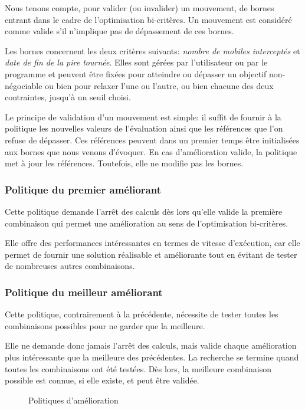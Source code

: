 			Nous tenons compte, pour valider (ou invalider) un mouvement, de bornes entrant dans le cadre de l'optimisation bi-critères. Un mouvement est considéré comme valide s'il n'implique pas de dépassement de ces bornes. 

			Les bornes concernent les deux critères suivants: \emph{nombre de mobiles interceptés} et \emph{date de fin de la pire tournée}. Elles sont gérées par l'utilisateur ou par le programme et peuvent être fixées pour atteindre ou dépasser un objectif non-négociable ou bien pour relaxer l'une ou l'autre, ou bien chacune des deux contraintes, jusqu'à un seuil choisi.

			Le principe de validation d'un mouvement est simple: il suffit de fournir à la politique les nouvelles valeurs de l'évaluation ainsi que les références que l'on refuse de dépasser. Ces références peuvent dans un premier temps être initialisées aux bornes que nous venons d'évoquer. En cas d'amélioration valide, la politique met à jour les références. Toutefois, elle ne modifie pas les bornes.

			\subsubsection{Politique du premier améliorant}
				\label{subs:first_available_policy}
				Cette politique demande l'arrêt des calculs dès lors qu'elle valide la première combinaison qui permet une amélioration au sens de l'optimisation bi-critères. 

				Elle offre des performances intéressantes en termes de vitesse d'exécution, car elle permet de fournir une solution réalisable et améliorante tout en évitant de tester de nombreuses autres combinaisons.

			\subsubsection{Politique du meilleur améliorant}
				\label{subs:best_available_policy}
				Cette politique, contrairement à la précédente, nécessite de tester toutes les combinaisons possibles pour ne garder que la meilleure. 

				Elle ne demande donc jamais l'arrêt des calculs, mais valide chaque amélioration plus intéressante que la meilleure des précédentes. La recherche se termine quand toutes les combinaisons ont été testées. Dès lors, la meilleure combinaison possible est connue, si elle existe, et peut être validée.

				\begin{figure}[h!]
					\centering
					\begin{tikzpicture}
						
					\end{tikzpicture}
					\caption[UML -- Politiques d'amélioration]{Politiques d'amélioration}
					\label{uml:available-policies}
				\end{figure}


